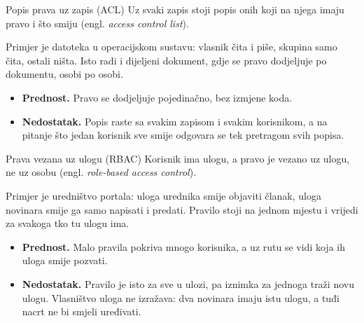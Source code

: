 \begin{frame}{Popis prava uz zapis (ACL)}
Uz svaki zapis stoji popis onih koji na njega imaju pravo i što smiju (engl. \emph{access control list}).

\vspace{1.1em}
Primjer je datoteka u operacijskom sustavu: vlasnik čita i piše, skupina samo čita, ostali ništa. Isto radi i dijeljeni dokument, gdje se pravo dodjeljuje po dokumentu, osobi po osobi.

\pause
\vspace{1.1em}
\begin{itemize}
  \itemsep0.6em
  \item \textbf{Prednost.} Pravo se dodjeljuje pojedinačno, bez izmjene koda.
  \item \textbf{Nedostatak.} Popis raste sa svakim zapisom i svakim korisnikom, a na pitanje što jedan korisnik sve smije odgovara se tek pretragom svih popisa.
\end{itemize}
\end{frame}

\begin{frame}{Prava vezana uz ulogu (RBAC)}
Korisnik ima ulogu, a pravo je vezano uz ulogu, ne uz osobu (engl. \emph{role-based access control}).

\vspace{1.1em}
Primjer je uredništvo portala: uloga urednika smije objaviti članak, uloga novinara smije ga samo napisati i predati. Pravilo stoji na jednom mjestu i vrijedi za svakoga tko tu ulogu ima.

\pause
\vspace{1.1em}
\begin{itemize}
  \itemsep0.6em
  \item \textbf{Prednost.} Malo pravila pokriva mnogo korisnika, a uz rutu se vidi koja ih uloga smije pozvati.
  \item \textbf{Nedostatak.} Pravilo je isto za sve u ulozi, pa iznimka za jednoga traži novu ulogu. Vlasništvo uloga ne izražava: dva novinara imaju istu ulogu, a tuđi nacrt ne bi smjeli uređivati.
\end{itemize}
\end{frame}

